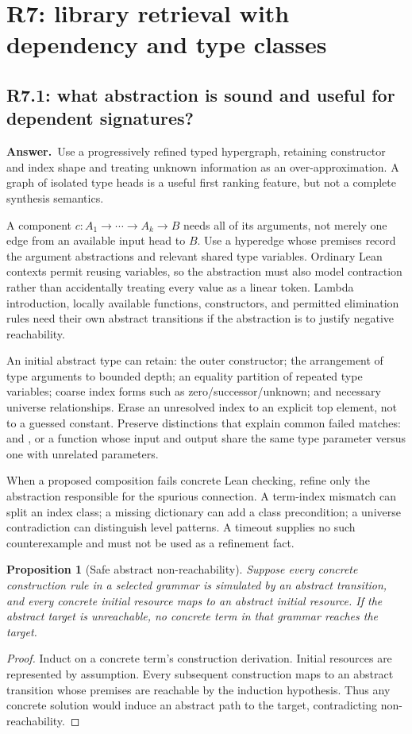 \documentclass[11pt,a4paper]{article}
\newtheorem{proposition}{Proposition}[section]
\theoremstyle{definition}
\theoremstyle{remark}
\newcommand{\code}[1]{\texttt{\detokenize{#1}}}
\newcommand{\ans}{\noindent\textbf{Answer.}\ }
\begin{document}
\section{R7: library retrieval with dependency and type classes}\label{sec:r7}

\subsection{R7.1: what abstraction is sound and useful for dependent signatures?}\label{q:R7.1}
\ans Use a progressively refined typed hypergraph, retaining constructor and
index shape and treating unknown information as an over-approximation. A graph
of isolated type heads is a useful first ranking feature, but not a complete
synthesis semantics.

A component $c:A_1\to\cdots\to A_k\to B$ needs all of its arguments, not merely
one edge from an available input head to $B$. Use a hyperedge whose premises
record the argument abstractions and relevant shared type variables. Ordinary
Lean contexts permit reusing variables, so the abstraction must also model
contraction rather than accidentally treating every value as a linear token.
Lambda introduction, locally available functions, constructors, and permitted
elimination rules need their own abstract transitions if the abstraction is
to justify negative reachability.

An initial abstract type can retain: the outer constructor; the arrangement
of type arguments to bounded depth; an equality partition of repeated type
variables; coarse index forms such as zero/successor/unknown; and necessary
universe relationships. Erase an unresolved index to an explicit top element,
not to a guessed constant. Preserve distinctions that explain common failed
matches: \code{Vec A n} and \code{Vec A (n+1)}, or a function whose input and
output share the same type parameter versus one with unrelated parameters.

When a proposed composition fails concrete Lean checking, refine only the
abstraction responsible for the spurious connection. A term-index mismatch can
split an index class; a missing dictionary can add a class precondition; a
universe contradiction can distinguish level patterns. A timeout supplies no
such counterexample and must not be used as a refinement fact.

\begin{proposition}[Safe abstract non-reachability]
Suppose every concrete construction rule in a selected grammar is simulated
by an abstract transition, and every concrete initial resource maps to an
abstract initial resource. If the abstract target is unreachable, no concrete
term in that grammar reaches the target.
\end{proposition}
\begin{proof}
Induct on a concrete term's construction derivation. Initial resources are
represented by assumption. Every subsequent construction maps to an abstract
transition whose premises are reachable by the induction hypothesis. Thus any
concrete solution would induce an abstract path to the target, contradicting
non-reachability.
\end{proof}
\end{document}

